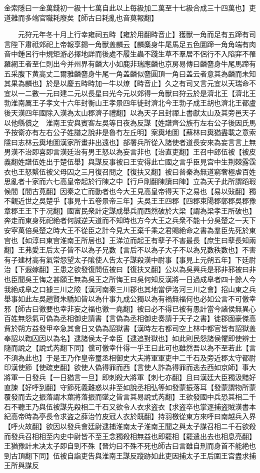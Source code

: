 金索隱曰一金萬錢初一級十七萬自此以上每級加二萬至十七級合成三十四萬也】吏道雜而多端官職耗廢矣【師古曰耗亂也音莫報翻】

　　元狩元年冬十月上行幸雍祠五畤【雍於用翻畤音止】獲獸一角而足有五蹄有司言陛下肅祗郊祀上帝報享錫一角獸盖麟云【麟麋身牛尾馬足五色圜蹄一角角端有肉音中鍾呂行中規矩游必擇地詳而後處不履生蟲不踐生草不羣居不侶行不入陷穽不罹羅網王者至仁則出今并州界有麟大小如鹿非瑞應麟也京房易傳曰麟麕身牛尾馬蹄有五采腹下黄高丈二爾雅麟麕身牛尾一角盖麟似麕圓頂一角曰盖云者意其為麟而未知其果為麟也】於是以慶五畤畤加一牛以燎【畤音止】久之有司又言元宜以天瑞命不宜以一二數一元曰建二元以長星曰光今元以郊得一角獸曰狩云於是濟北王【濟北王勃淮南厲王子孝文十六年封衡山王孝景四年徙封濟北今王勃子成王胡也濟北王都盧後天漢四年國除入漢為太山郡濟子禮翻】以為天子且封禪上書獻太山及其旁邑天子以他縣償之　淮南王安與賓客左吳等日夜為反謀【姓譜齊公族冇左右公子後因氏馬予按衛亦有左右公子姓譜之說非是魯冇左丘明】案輿地圖【蘇林曰輿猶盡載之意索隱曰志林云輿地圖漢家所畫非出遠也】部署兵所從入諸使者道長安來為妄言言上無男漢不治即喜即言漢廷治有男王怒以為妄言非也【治直吏翻】王召中郎伍被【被皮義翻姓譜伍姓出于楚伍舉】與謀反事被曰王安得此亡國之言乎臣見宫中生荆棘露霑衣也王怒繫伍被父母囚之三月復召問之【復扶又翻】被曰㫺秦為無道窮奢極虐百姓思亂者十家而六七高皇帝起於行陳之中【行戶剛翻陳讀曰陣】立為天子此所謂蹈瑕候間【間古莧翻】因秦之亡而動者也今大王見高皇帝得天下之易也【易以䜴翻】獨不觀近世之吳楚乎【事見十五卷景帝三年】夫吳王王四郡【四郡束陽郡鄣郡吳郡豫章郡王王下于况翻】國富民衆計定謀成舉兵而西然破於大梁【謂為梁孝王所破也】奔走而東身死祀絶者何誠逆天道而不知時也方今大王之兵衆不能十分吳楚之一天下安寜萬倍吳楚之時大王不從臣之計今見大王棄千乘之君賜絶命之書為羣臣先死於東宫也【如淳曰東宫淮南王所居也】王涕泣而起王有孽子不害最長【庶生曰孽長知兩翻】王弗愛王后太子皆不以為子兄數【言后不以為子大子不以為兄數秩數也】不害有子建材高有氣常怨望太子隂使人告太子謀殺漢中尉事【事見上元朔五年】下廷尉治【下遐嫁翻】王患之欲發復問伍被曰【復扶又翻】公以為吳興兵是邪非邪被曰非也臣聞吳王悔之甚願王無為吳王之所悔王曰吳何知反漢將一日過成臯者四十餘人今我絶成臯之口據三川之險【漢河南秦三川郡也其地當伊洛河三川之會】招山東之兵舉事如此左吳趙賢朱驕如皆以為什事九成公獨以為有禍無福何也必如公言不可儌幸邪【師古曰徼要也幸非妄之福也徼一堯翻】被曰必不得已被有愚計當今諸侯無異心百姓無怨氣可偽為丞相御史請書【言偽為丞相御史奏請于天子之書】徙郡國豪傑高貲於朔方益發甲卒急其會日又偽為詔獄書【漢時左右都司空上林中都官皆有詔獄盖奉詔以鞫囚因以為名】逮諸侯太子幸臣【逮追對獄也】如此則民怨諸侯懼即使辨士隨而說之【說式芮翻下同】儻可儌幸什得一乎王曰此可也雖然吾以為不至若此【言不須為此也】于是王乃作皇帝璽丞相御史大夫將軍軍吏中二千石及旁近郡太守都尉印漢使節【使疏吏翻】欲使人偽得罪而西【言使人詐為得罪而逃去西如京師】事大將軍一日發兵【一日猶言一旦】即刺殺大將軍【刺七亦翻】且曰漢廷大臣獨汲黯好直諫【好呼到翻】守節死義難惑以非至如說丞相弘等如發蒙振落耳【發蒙謂物所蒙覆發而去之振落謂木葉將落振而墜之皆言其易說式芮翻】王欲發國中兵恐其相二千石不聽王乃與伍被謀先殺相二千石又欲令人衣求盗衣【求盗卒也掌逐捕盗賊漢書本紀高帝時為亭長令求盗之薛治竹皮冠人衣於既翻】持羽檄從東方來呼曰南越兵入界【呼火故翻】欲因以發兵會廷尉逮捕淮南太子淮南王聞之與太子謀召相二千石欲殺而發兵召相相至内史中尉皆不至王念獨殺相無益也即罷相【罷遣出去也相息亮翻】王猶豫計未决太子即自剄不殊【晉灼曰不殊不死也師古曰言雖自刑而身首不能絶也剄古頂翻下同】伍被自詣吏告與淮南王謀反蹤跡如此吏因捕太子王后圍王宫盡求捕王所與謀反